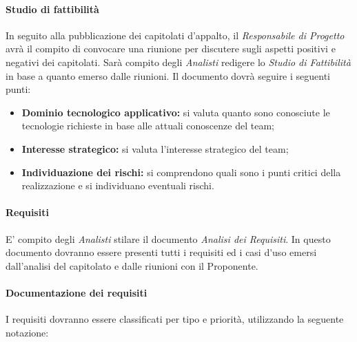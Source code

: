 \paragraph{Studio di fattibilità}
In seguito alla pubblicazione dei capitolati d'appalto, il \textit{Responsabile di Progetto} avrà il compito di convocare una riunione per discutere sugli aspetti positivi e negativi dei capitolati. Sarà compito degli \textit{Analisti} redigere lo \textit{Studio di Fattibilità} in base a quanto emerso dalle riunioni. Il documento dovrà seguire i seguenti punti:
\begin{itemize}
	\item \textbf{Dominio tecnologico  applicativo: }si valuta quanto sono conosciute le tecnologie richieste in base alle attuali conoscenze del team;
	\item \textbf{Interesse strategico: }si valuta l'interesse strategico del team;
	\item \textbf{Individuazione dei rischi: }si comprendono quali sono i punti critici della realizzazione e si individuano eventuali rischi. 
\end{itemize}

\paragraph{Requisiti}
E' compito degli \textit{Analisti} stilare il documento \textit{Analisi dei Requisiti}.
In questo documento dovranno essere presenti tutti i requisiti ed i \gls{casi d'uso} emersi dall'analisi del capitolato e dalle riunioni con il Proponente.\\

\paragraph{Documentazione dei requisiti}

I requisiti dovranno essere classificati per tipo e priorità, utilizzando la seguente notazione:

